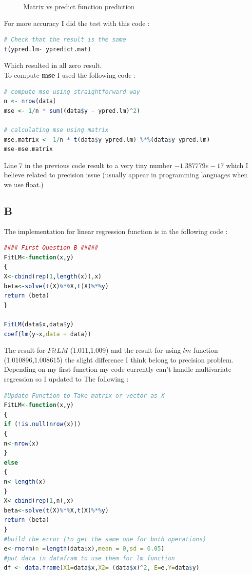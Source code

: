 \documentclass{article}
\begin{document}
\begin{multicols*}{2}
\begin{figure}[H]
\begin{center}
\end{center}
\caption{Matrix vs predict function prediction}
\end{figure}
For more accuracy I did the test with this code :
\begin{lstlisting}[language=R]
# Check that the result is the same 
t(ypred.lm- ypredict.mat)
\end{lstlisting}
Which resulted in all zero result.\\
To compute \textbf{mse} I used the following code : 
\begin{lstlisting}[language=R]
# compute mse using straightforward way
n <- nrow(data)
mse <- 1/n * sum((data$y - ypred.lm)^2)

# calculating mse using matrix
mse.matrix <- 1/n * t(data$y-ypred.lm) %*%(data$y-ypred.lm)
mse-mse.matrix
\end{lstlisting}
\begin{flushleft}
Line 7 in the previous code result to a very tiny number \(-1.387779e-17\) which I believe related to precision issue (usually appear in programming languages when we use float.)
\end{flushleft}
{\centering\subsection*{B}}
The implementation for linear regression function is in the following code : 
\begin{lstlisting}[language=R]
#### First Question B #####
FitLM<-function(x,y)
{
X<-cbind(rep(1,length(x)),x)
beta<-solve(t(X)%*%X,t(X)%*%y)
return (beta)
}

FitLM(data$x,data$y)
coef(lm(y~x,data = data))
\end{lstlisting}
\begin{flushleft}
The result for \(FitLM\) (1.011,1.009) and the result for using \(lm\) function (1.010896,1.008615) the slight difference I think belong to precision problem.\\
Depending on my first function my code currently can't handle multivariate regression so I updated to The following :
\begin{lstlisting}[language=R]
#Update Function to Take matrix or vector as X
FitLM<-function(x,y)
{
if (!is.null(nrow(x)))
{
n<-nrow(x)
}
else
{
n<-length(x)
}
X<-cbind(rep(1,n),x)
beta<-solve(t(X)%*%X,t(X)%*%y)
return (beta)
}
#build the error (to get the same one for both operations)
e<-rnorm(n =length(data$x),mean = 0,sd = 0.05)
#put data in datafram to use them for lm function
df <- data.frame(X1=data$x,X2= (data$x)^2, E=e,Y=data$y)


\end{lstlisting}
\end{flushleft}
\end{multicols*}
\end{document}
